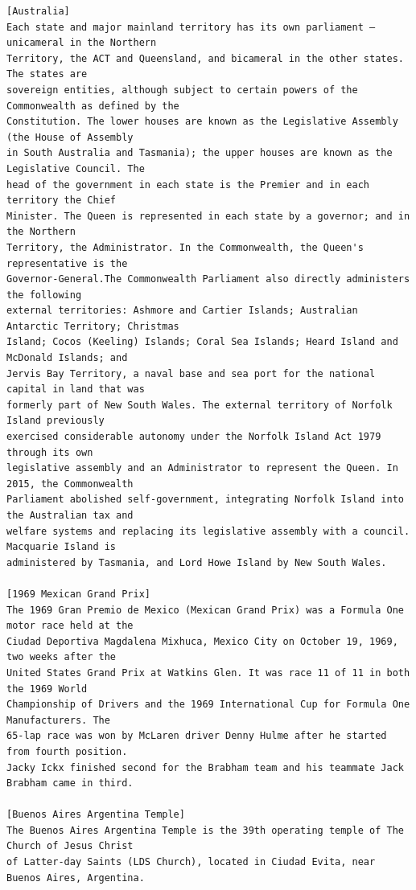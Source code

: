 \documentclass[10pt]{article}
\begin{document}
\begin{verbatim}
[Australia]
Each state and major mainland territory has its own parliament — unicameral in the Northern
Territory, the ACT and Queensland, and bicameral in the other states. The states are
sovereign entities, although subject to certain powers of the Commonwealth as defined by the
Constitution. The lower houses are known as the Legislative Assembly (the House of Assembly
in South Australia and Tasmania); the upper houses are known as the Legislative Council. The
head of the government in each state is the Premier and in each territory the Chief
Minister. The Queen is represented in each state by a governor; and in the Northern
Territory, the Administrator. In the Commonwealth, the Queen's representative is the
Governor-General.The Commonwealth Parliament also directly administers the following
external territories: Ashmore and Cartier Islands; Australian Antarctic Territory; Christmas
Island; Cocos (Keeling) Islands; Coral Sea Islands; Heard Island and McDonald Islands; and
Jervis Bay Territory, a naval base and sea port for the national capital in land that was
formerly part of New South Wales. The external territory of Norfolk Island previously
exercised considerable autonomy under the Norfolk Island Act 1979 through its own
legislative assembly and an Administrator to represent the Queen. In 2015, the Commonwealth
Parliament abolished self-government, integrating Norfolk Island into the Australian tax and
welfare systems and replacing its legislative assembly with a council. Macquarie Island is
administered by Tasmania, and Lord Howe Island by New South Wales.

[1969 Mexican Grand Prix]
The 1969 Gran Premio de Mexico (Mexican Grand Prix) was a Formula One motor race held at the
Ciudad Deportiva Magdalena Mixhuca, Mexico City on October 19, 1969, two weeks after the
United States Grand Prix at Watkins Glen. It was race 11 of 11 in both the 1969 World
Championship of Drivers and the 1969 International Cup for Formula One Manufacturers. The
65-lap race was won by McLaren driver Denny Hulme after he started from fourth position.
Jacky Ickx finished second for the Brabham team and his teammate Jack Brabham came in third.

[Buenos Aires Argentina Temple]
The Buenos Aires Argentina Temple is the 39th operating temple of The Church of Jesus Christ
of Latter-day Saints (LDS Church), located in Ciudad Evita, near Buenos Aires, Argentina.


\end{verbatim}
\end{document}
